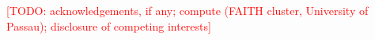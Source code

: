 \documentclass[sigconf,nonacm]{acmart}
\newcommand{\TODO}[1]{\textcolor{red}{[TODO: #1]}}
\begin{document}
\maketitle










\begin{acks}
\TODO{acknowledgements, if any; compute (FAITH cluster, University of Passau); disclosure of competing interests}
\end{acks}



\end{document}
